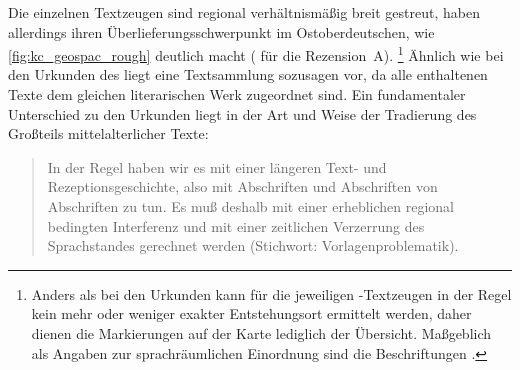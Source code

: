 Die einzelnen Textzeugen sind regional verhältnismäßig breit gestreut, haben
allerdings ihren Überlieferungsschwerpunkt im Ostoberdeutschen, wie
\cref{fig:kc_geospac_rough} deutlich macht
(\cite[vgl.~auch][]{klein1988} für die Rezension~A).%
%
	\footnote{Anders als bei den Urkunden kann für die jeweiligen
		\KC{}-Textzeugen in der Regel kein mehr oder weniger exakter
		Entstehungsort ermittelt werden, daher dienen die Markierungen auf der
		Karte lediglich der Übersicht. Maßgeblich als Angaben zur
		sprachräumlichen Einordnung sind die Beschriftungen
		\autocite[vgl.][]{wolf:kckat}.}
%
Ähnlich wie bei den Urkunden des \CAO{} liegt eine Textsammlung
sozusagen  vor, da alle enthaltenen Texte dem gleichen
literarischen Werk zugeordnet sind. Ein fundamentaler Unterschied zu den
Urkunden liegt in der Art und Weise der Tradierung des Großteils
mittelalterlicher Texte: \blockquote[{\cites[1310]{wegera2000}[siehe
auch][262--263]{fleischer2019}}]{In der Regel haben wir es mit einer längeren
Text- und Rezeptionsgeschichte, also mit Abschriften und Abschriften von
Abschriften zu tun. Es muß deshalb mit einer erheblichen regional bedingten
Interferenz und mit einer zeitlichen Verzerrung des Sprachstandes gerechnet
werden (Stichwort: Vorlagenproblematik).}



